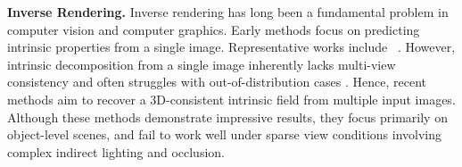 \vspace{0.5em}
\noindent \textbf{Inverse Rendering.}
Inverse rendering has long been a fundamental problem in computer vision and computer graphics.
Early methods focus on predicting intrinsic properties from a single image. Representative works include ~\cite{10.1145/3641519.3657445,careaga2024colorful,liang2025diffusion,chen2024intrinsicanything,zeng2024dilightnet,careaga2023intrinsic,kocsis2024intrinsic}. However, intrinsic decomposition from a single image inherently lacks multi-view consistency and often struggles with out-of-distribution cases \cite{du2024gs}.
Hence, recent methods \cite{du2024gs,liang2024gs,gu2025irgs,shi2025gir,wynn2023diffusionerf,ni2025decompositional} aim to recover a 3D-consistent intrinsic field from multiple input images. Although these methods demonstrate impressive results, they focus primarily on object-level scenes, and fail to work well under sparse view conditions involving complex indirect lighting and occlusion. 




